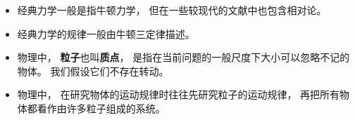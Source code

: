 
\begin{issues}
\issueDraft
\end{issues}

\begin{itemize}
\item 经典力学一般是指牛顿力学， 但在一些较现代的文献中也包含相对论。
\item 经典力学的规律一般由牛顿三定律描述。
\item 物理中， \textbf{粒子}也叫\textbf{质点}， 是指在当前问题的一般尺度下大小可以忽略不记的物体。 我们假设它们不存在转动。
\item 物理中， 在研究物体的运动规律时往往先研究粒子的运动规律， 再把所有物体都看作由许多粒子组成的系统。
\end{itemize}
